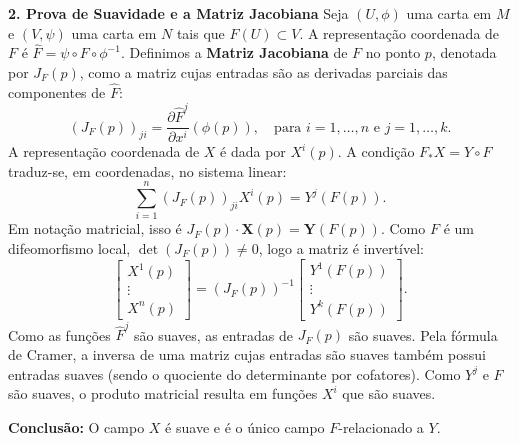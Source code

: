 {	\textbf{2. Prova de Suavidade e a Matriz Jacobiana}
	Seja $(U, \phi)$ uma carta em $M$ e $(V, \psi)$ uma carta em $N$ tais que $F(U) \subset V$. A representação coordenada de $F$ é $\hat{F} = \psi \circ F \circ \phi^{-1}$. Definimos a \textbf{Matriz Jacobiana} de $F$ no ponto $p$, denotada por $J_F(p)$, como a matriz cujas entradas são as derivadas parciais das componentes de $\hat{F}$:
	\begin{equation*}
		(J_F(p))_{ji} = \frac{\partial \hat{F}^j}{\partial x^i}(\phi(p)), \quad \text{para } i=1, \dots, n \text{ e } j=1, \dots, k.
	\end{equation*}
	A representação coordenada de $X$ é dada por $X^i(p)$. A condição $F_* X = Y \circ F$ traduz-se, em coordenadas, no sistema linear:
	\begin{equation*}
		\sum_{i=1}^n (J_F(p))_{ji} X^i(p) = Y^j(F(p)).
	\end{equation*}
	Em notação matricial, isso é $J_F(p) \cdot \mathbf{X}(p) = \mathbf{Y}(F(p))$. Como $F$ é um difeomorfismo local, $\det(J_F(p)) \neq 0$, logo a matriz é invertível:
	\begin{equation*}
		\begin{bmatrix} X^1(p) \\ \vdots \\ X^n(p) \end{bmatrix} = (J_F(p))^{-1} \begin{bmatrix} Y^1(F(p)) \\ \vdots \\ Y^k(F(p)) \end{bmatrix}.
	\end{equation*}
	Como as funções $\hat{F}^j$ são suaves, as entradas de $J_F(p)$ são suaves. Pela fórmula de Cramer, a inversa de uma matriz cujas entradas são suaves também possui entradas suaves (sendo o quociente do determinante por cofatores). Como $Y^j$ e $F$ são suaves, o produto matricial resulta em funções $X^i$ que são suaves.
	
	\textbf{Conclusão:}
	O campo $X$ é suave e é o único campo $F$-relacionado a $Y$.
}
